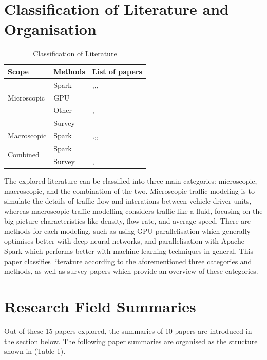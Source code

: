 \documentclass[11pt]{uonthesis}
\begin{document}
\section{Classification of Literature and Organisation} %
\begin{table}[h]
\begin{tabular}{ |p{2cm}|p{2cm}||p{3.2cm}| }
    \hline
    Scope & Methods & List of papers\\
    \hline
    \multirow{3}{3em}{Microscopic} & Spark & \cite{10.1145/2820783.2820860},\cite{yu2020dissecting},\cite{10.1007/978-981-16-4126-8_24},\cite{9077707}
    \\
    & GPU & \cite{9075295}
    \\
    & Other & \cite{8569938},\cite{10.1145/3397536.3422274} 
    \\
    & Survey & \cite{gora2020microscopic}\\
    \hline
    Macroscopic & Spark & \cite{Sigurdsson2018RoadTC},\cite{Yang2019},\cite{FAN2019298},\cite{Zhang20231124}\\
    \hline
    \multirow{2}{2em}{Combined} & Spark & \cite{STARK}
    \\
    & Survey & \cite{10356753}, \cite{LI2020225}\\
    \hline
\end{tabular}
\caption{Classification of Literature}
\end{table}

The explored literature can be classified into three main categories: microscopic, macroscopic, and the combination of the two. Microscopic traffic modeling is to simulate the details of traffic flow and interations between vehicle-driver units, whereas macroscopic traffic modelling considers traffic like a fluid, focusing on the big picture characteristics like density, flow rate, and average speed. There are methods for each modeling, such as using GPU parallelisation which generally optimises better with deep neural networks, and parallelisation with Apache Spark which performs better with machine learning techniques in general. This paper classifies literature according to the aforementioned three categories and methods, as well as survey papers which provide an overview of these categories.

\section{Research Field Summaries} %
Out of these 15 papers explored, the summaries of 10 papers are introduced in the section below. The following paper summaries are organised as the structure shown in (Table 1). 
\end{document}
